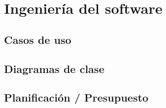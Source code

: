 \section{Ingeniería del software}

\subsection{Casos de uso}

\subsection{Diagramas de clase}

\subsection{Planificación / Presupuesto}
